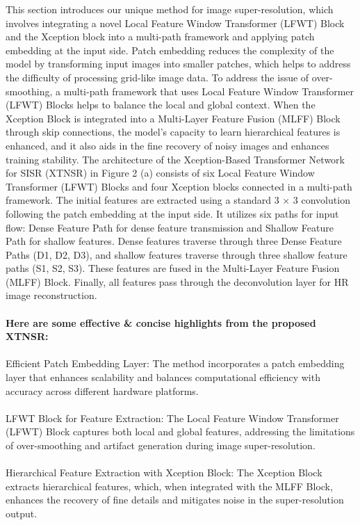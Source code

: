 \documentclass[twocolumn]{svjour3}          %
\begin{document}
This section introduces our unique method for image super-resolution, which involves integrating a novel Local Feature Window Transformer (LFWT) Block and the Xception block into a multi-path framework and applying patch embedding at the input side. Patch embedding reduces the complexity of the model by transforming input images into smaller patches, which helps to address the difficulty of processing grid-like image data. To address the issue of over-smoothing, a multi-path framework that uses Local Feature Window Transformer (LFWT) Blocks helps to balance the local and global context. When the Xception Block is integrated into a Multi-Layer Feature Fusion (MLFF) Block through skip connections, the model's capacity to learn hierarchical features is enhanced, and it also aids in the fine recovery of noisy images and enhances training stability.
The architecture of the Xception-Based Transformer Network for SISR (XTNSR) in Figure 2 (a) consists of six Local Feature Window Transformer (LFWT) Blocks and four Xception blocks connected in a multi-path framework. The initial features are extracted using a standard 3 × 3 convolution following the patch embedding at the input side. It utilizes six paths for input flow: Dense Feature Path for dense feature transmission and Shallow Feature Path for shallow features. Dense features traverse through three Dense Feature Paths (D1, D2, D3), and shallow features traverse through three shallow feature paths (S1, S2, S3). These features are fused in the Multi-Layer Feature Fusion (MLFF) Block. Finally, all features pass through the deconvolution layer for HR image reconstruction.\\
\\
\textbf{Here are some effective \& concise highlights from the proposed XTNSR:}\\
\\
Efficient Patch Embedding Layer: The method incorporates a patch embedding layer that enhances scalability and balances computational efficiency with accuracy across different hardware platforms.\\
\\
LFWT Block for Feature Extraction: The Local Feature Window Transformer (LFWT) Block captures both local and global features, addressing the limitations of over-smoothing and artifact generation during image super-resolution.\\
\\
Hierarchical Feature Extraction with Xception Block: The Xception Block extracts hierarchical features, which, when integrated with the MLFF Block, enhances the recovery of fine details and mitigates noise in the super-resolution output.\\
\end{document}
